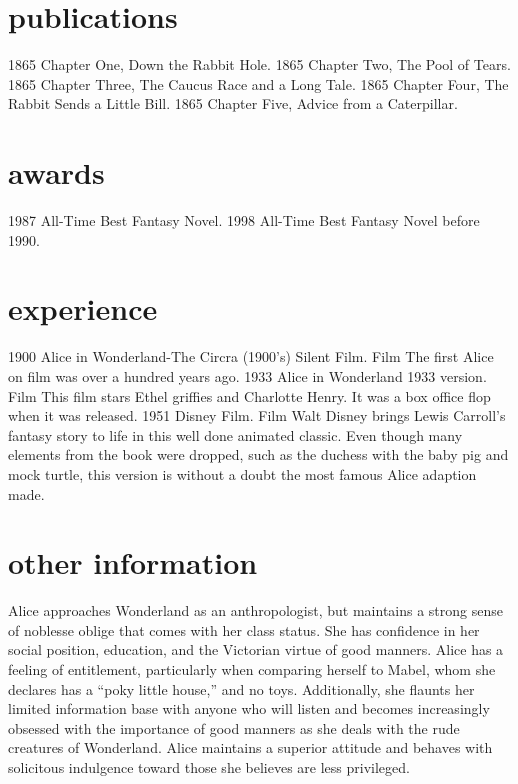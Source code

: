\documentclass[]{twentysecondcv}
\begin{document}
\section{publications}
\begin{twentyshort}
	\twentyitemshort
	{1865}
	{Chapter One, Down the Rabbit Hole.}
	\twentyitemshort
	{1865}
	{Chapter Two, The Pool of Tears.}
	\twentyitemshort
	{1865}
	{Chapter Three,  The Caucus Race and a Long Tale.}
	\twentyitemshort
	{1865}
	{Chapter Four,  The Rabbit Sends a Little Bill.}
	\twentyitemshort
	{1865}
	{Chapter Five,  Advice from a Caterpillar.}
\end{twentyshort}

\section{awards}
\begin{twentyshort}
	\twentyitemshort
	{1987}
	{All-Time Best Fantasy Novel.}
	\twentyitemshort
	{1998}
	{All-Time Best Fantasy Novel before 1990.}
\end{twentyshort}

\section{experience}
\begin{twenty}
	\twentyitem
	{1900}
	{Alice in Wonderland-The Circra (1900's) Silent Film.}
	{Film}
	{The first Alice on film was over a hundred years ago.}
	\twentyitem
	{1933}
	{Alice in Wonderland 1933 version.}
	{Film}
	{This film stars Ethel griffies and Charlotte Henry. It was a box office flop when it was released.}
	\twentyitem
	{1951}
	{Disney Film.}
	{Film}
	{Walt Disney brings Lewis Carroll's fantasy story to life in this well done animated classic. Even though many elements from the book were dropped, such as the duchess with the baby pig and mock turtle, this version is without a doubt the most famous Alice adaption made.}

\end{twenty}
\section{other information}
Alice approaches Wonderland as an anthropologist, but maintains a strong sense of noblesse oblige that comes with her class status. She has confidence in her social position, education, and the Victorian virtue of good manners. Alice has a feeling of entitlement, particularly when comparing herself to Mabel, whom she declares has a “poky little house,” and no toys. Additionally, she flaunts her limited information base with anyone who will listen and becomes increasingly obsessed with the importance of good manners as she deals with the rude creatures of Wonderland. Alice maintains a superior attitude and behaves with solicitous indulgence toward those she believes are less privileged.

\end{document}
